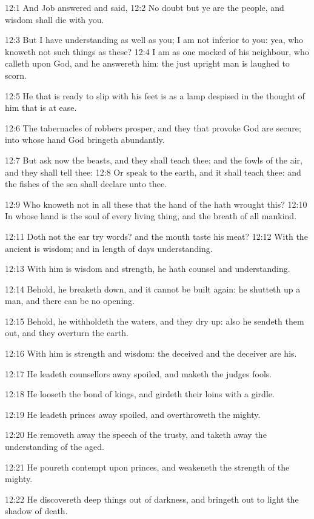 12:1 And Job answered and said, 12:2 No doubt but ye are the people,
and wisdom shall die with you.

12:3 But I have understanding as well as you; I am not inferior to
you: yea, who knoweth not such things as these?  12:4 I am as one
mocked of his neighbour, who calleth upon God, and he answereth him:
the just upright man is laughed to scorn.

12:5 He that is ready to slip with his feet is as a lamp despised in
the thought of him that is at ease.

12:6 The tabernacles of robbers prosper, and they that provoke God are
secure; into whose hand God bringeth abundantly.

12:7 But ask now the beasts, and they shall teach thee; and the fowls
of the air, and they shall tell thee: 12:8 Or speak to the earth, and
it shall teach thee: and the fishes of the sea shall declare unto
thee.

12:9 Who knoweth not in all these that the hand of the \LORD hath
wrought this?  12:10 In whose hand is the soul of every living thing,
and the breath of all mankind.

12:11 Doth not the ear try words? and the mouth taste his meat?  12:12
With the ancient is wisdom; and in length of days understanding.

12:13 With him is wisdom and strength, he hath counsel and
understanding.

12:14 Behold, he breaketh down, and it cannot be built again: he
shutteth up a man, and there can be no opening.

12:15 Behold, he withholdeth the waters, and they dry up: also he
sendeth them out, and they overturn the earth.

12:16 With him is strength and wisdom: the deceived and the deceiver
are his.

12:17 He leadeth counsellors away spoiled, and maketh the judges
fools.

12:18 He looseth the bond of kings, and girdeth their loins with a
girdle.

12:19 He leadeth princes away spoiled, and overthroweth the mighty.

12:20 He removeth away the speech of the trusty, and taketh away the
understanding of the aged.

12:21 He poureth contempt upon princes, and weakeneth the strength of
the mighty.

12:22 He discovereth deep things out of darkness, and bringeth out to
light the shadow of death.

